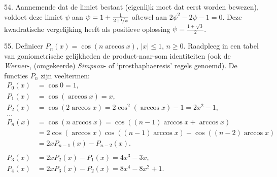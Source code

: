 \begin{problem}{54.}
	Aannemende dat de limiet bestaat (eigenlijk moet dat eerst worden bewezen), voldoet deze limiet $\psi$ aan $\psi = 1 + \frac{1}{2 + \nicefrac{1}{\psi}}$ oftewel aan $2 \psi^2 - 2 \psi - 1 = 0$. Deze kwadratische vergelijking heeft als positieve oplossing $\psi = \frac{1 + \sqrt{3}}{2}$.
\end{problem}

\clearpage

\begin{problem}{55.}
	Definieer $P_n(x) = \cos (n \arccos x)$, $|x| \leqslant 1$, $n \geq 0$. Raadpleeg in een tabel van goniometrische gelijkheden de product-naar-som identi\-teiten (ook de \textit{Werner}-, (omgekeerde) \textit{Simpson}- of `prosthaphaeresis' regels genoemd). De functies $P_n$ zijn veeltermen:
    \begin{equation*}
    \begin{split}
        P_0(x) & = \cos 0 = 1, \\
        P_1(x) & = \cos (\arccos x) = x, \\
        P_2(x) & = \cos (2 \arccos x) = 2 \cos^2 (\arccos x) - 1 = 2 x^2 - 1, \\
        \dots \\
        P_n(x) & = \cos (n \arccos x) = \cos ((n - 1) \arccos x + \arccos x) \\
               & = 2 \cos (\arccos x) \cos ((n - 1) \arccos x) - \cos ((n - 2) \arccos x) \\
               & = 2 x P_{n-1}(x) - P_{n-2}(x). \\
        \\
        P_3(x) & = 2 x P_2(x) - P_1(x) = 4 x^3 - 3 x, \\
        P_4(x) & = 2 x P_3(x) - P_2(x) = 8 x^4 - 8 x^2 + 1.
    \end{split}
    \end{equation*}
\end{problem}

